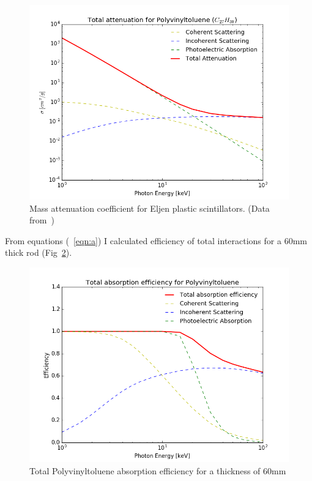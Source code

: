 \documentclass[10pt,a4paper, openany]{book}
\begin{document}
\begin{figure}[!h]
\begin{center}
\includegraphics[scale=0.45]{imm/cs_ej-2xx.png}
\end{center}
\caption{Mass attenuation coefficient for Eljen plastic scintillators. (Data from~\cite{gagg:2})} 
\label{fig:ejcs}
\end{figure}

From equations (~\ref{eqn:a}) I calculated efficiency of total interactions for a 60mm thick rod (Fig~\ref{fig:ejef}).

\begin{figure}[!h]
\begin{center}
\includegraphics[scale=0.45]{imm/eff_ej-2xx.png}
\end{center}
\caption{Total Polyvinyltoluene absorption efficiency for a thickness of 60mm} 
\label{fig:ejef}
\end{figure}
\end{document}
